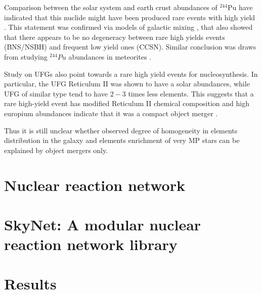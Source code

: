 Comparison between the solar system and earth crust abundances of $^{244}$Pu have indicated that this nuclide might have been produced rare events with high yield \citep{Wallner:2015}. This statement was confirmed via models of galactic mixing \citep{Hotokezaka:2015zea}, that also showed that there appears to be no degeneracy between rare high yields events (\ac{BNS}/\ac{NSBH}) and frequent low yield ones (\ac{CCSN}). Similar conclusion was draws from studying $^{244}Pu$ abundances in meteorites \citep{Tsujimoto:2017}.

Study on \acp{UFG} also point towards a rare high yield events for \rproc{} nucleosynthesis. In particular, the \ac{UFG} Reticulum II was shown to have a solar \rproc{} abundances, while \ac{UFG} of similar type tend to have $2-3$ times less \rproc{} elements. This suggests that a rare high-yield event has modified Reticulum II chemical composition and high europium abundances indicate that it was a compact object merger \citep{Ji:2016}. 

Thus it is still unclear whether observed degree of homogeneity in \rproc{} elements distribution in the galaxy and \rproc{} elements enrichment of very \ac{MP} stars can be explained by object mergers only. 



\section{Nuclear reaction network}

\section{SkyNet: A modular nuclear reaction network library}


\section{Results}








